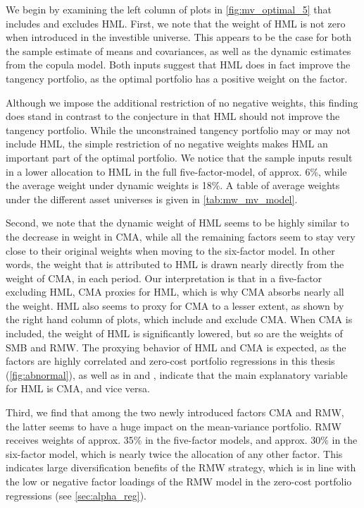 We begin by examining the left column of plots in \autoref{fig:mv_optimal_5} that includes and excludes HML. First, we note that the weight of HML is not zero when introduced in the investible universe. This appears to be the case for both the sample estimate of means and covariances, as well as the dynamic estimates from the copula model. Both inputs suggest that HML does in fact improve the tangency portfolio, as the optimal portfolio has a positive weight on the factor. 

Although we impose the additional restriction of no negative weights, this finding does stand in contrast to the conjecture in \textcite{FF2015} that HML should not improve the tangency portfolio. While the unconstrained tangency portfolio may or may not include HML, the simple restriction of no negative weights makes HML an important part of the optimal portfolio. We notice that the sample inputs result in a lower allocation to HML in the full five-factor-model, of approx. 6\%, while the average weight under dynamic weights is 18\%. A table of average weights under the different asset universes is given in \autoref{tab:mw_mv_model}.

Second, we note that the dynamic weight of HML seems to be highly similar to the decrease in weight in CMA, while all the remaining factors seem to stay very close to their original weights when moving to the six-factor model. In other words, the weight that is attributed to HML is drawn nearly directly from the weight of CMA, in each period. Our interpretation is that in a five-factor excluding HML, CMA proxies for HML, which is why CMA absorbs nearly all the weight. HML also seems to proxy for CMA to a lesser extent, as shown by the right hand column of plots, which include and exclude CMA. When CMA is included, the weight of HML is significantly lowered, but so are the weights of SMB and RMW. The proxying behavior of HML and CMA is expected, as the factors are highly correlated and zero-cost portfolio regressions in this thesis (\autoref{fig:abnormal}), as well as in \textcite{FF2015} and \textcite{Asness2015}, indicate that the main explanatory variable for HML is CMA, and vice versa.

Third, we find that among the two newly introduced factors CMA and RMW, the latter seems to have a huge impact on the mean-variance portfolio. RMW receives weights of approx. 35\% in the five-factor models, and approx. 30\% in the six-factor model, which is nearly twice the allocation of any other factor. This indicates large diversification benefits of the RMW strategy, which is in line with the low or negative factor loadings of the RMW model in the zero-cost portfolio regressions (see \autoref{sec:alpha_reg}).

